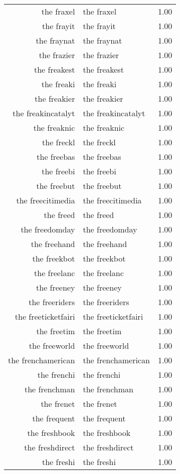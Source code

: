 \begin{table}[ht]
\begin{tabular}{rlr}
  the fraxel & the fraxel & 1.00 \\ 
  the frayit & the frayit & 1.00 \\ 
  the fraynat & the fraynat & 1.00 \\ 
  the frazier & the frazier & 1.00 \\ 
  the freakest & the freakest & 1.00 \\ 
  the freaki & the freaki & 1.00 \\ 
  the freakier & the freakier & 1.00 \\ 
  the freakincatalyt & the freakincatalyt & 1.00 \\ 
  the freaknic & the freaknic & 1.00 \\ 
  the freckl & the freckl & 1.00 \\ 
  the freebas & the freebas & 1.00 \\ 
  the freebi & the freebi & 1.00 \\ 
  the freebut & the freebut & 1.00 \\ 
  the freecitimedia & the freecitimedia & 1.00 \\ 
  the freed & the freed & 1.00 \\ 
  the freedomday & the freedomday & 1.00 \\ 
  the freehand & the freehand & 1.00 \\ 
  the freekbot & the freekbot & 1.00 \\ 
  the freelanc & the freelanc & 1.00 \\ 
  the freeney & the freeney & 1.00 \\ 
  the freeriders & the freeriders & 1.00 \\ 
  the freeticketfairi & the freeticketfairi & 1.00 \\ 
  the freetim & the freetim & 1.00 \\ 
  the freeworld & the freeworld & 1.00 \\ 
  the frenchamerican & the frenchamerican & 1.00 \\ 
  the frenchi & the frenchi & 1.00 \\ 
  the frenchman & the frenchman & 1.00 \\ 
  the frenet & the frenet & 1.00 \\ 
  the frequent & the frequent & 1.00 \\ 
  the freshbook & the freshbook & 1.00 \\ 
  the freshdirect & the freshdirect & 1.00 \\ 
  the freshi & the freshi & 1.00 \\ 

\end{tabular}
\end{table}
